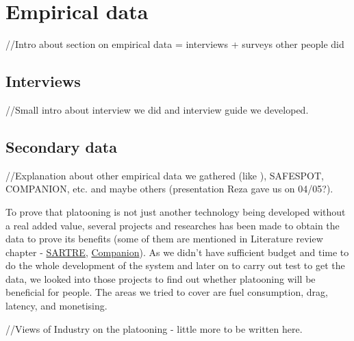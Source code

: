 \section{Empirical data}\label{sec:data}
% 
//Intro about section on empirical data = interviews + surveys other people did
% 
\subsection{Interviews}
% 
//Small intro about interview we did and interview guide we developed.
% 

% 
\subsection{Secondary data}
% 
//Explanation about other empirical data we gathered (like \cite{Shladover2015IndustryPlatooning}), SAFESPOT, COMPANION, etc. and maybe others (presentation Reza gave us on 04/05?).\par
% 
To prove that platooning is not just another technology being developed without a real added value, several projects and researches has been made to obtain the data to prove its benefits (some of them are mentioned in Literature review chapter - \hyperref[sec:SARTRE]{SARTRE}, \hyperref[sec:Companion]{Companion}). As we didn’t have sufficient budget and time to do the whole development of the system and later on to carry out test to get the data, we looked into those projects to find out whether platooning will be beneficial for people. The areas we tried to cover are fuel consumption, drag, latency, and monetising.
% 

% 

% 

% 
//Views of Industry on the platooning - little more to be written here.